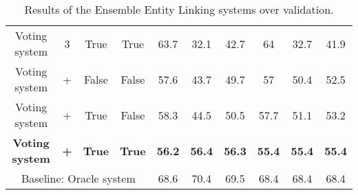 \begin{table}[h!]
{\begin{tabular}{|c|ccc|ccc|ccc|}
    Voting system                    & 3                                                                                                    & True                                                                                                      & True                               & 63.7                                 & 32.1                                    & 42.7              & 64                                   & 32.7                                    & 41.9              \\
    Voting system                    & +                                                                                                    & False                                                                                                     & False                              & 57.6                                 & 43.7                                    & 49.7              & 57                                   & 50.4                                    & 52.5              \\
    Voting system                    & +                                                                                                    & True                                                                                                      & False                              & 58.3                                 & 44.5                                    & 50.5              & 57.7                                 & 51.1                                    & 53.2              \\
    \textbf{Voting system}           & \textbf{+}                                                                                           & \textbf{True}                                                                                             & \textbf{True}                      & \textbf{56.2}                        & \textbf{56.4}                           & \textbf{56.3}     & \textbf{55.4}                        & \textbf{55.4}                           & \textbf{55.4}     \\ \hline
    \multicolumn{4}{|c|}{Baseline: Oracle system}                                                                                                                                                                                                                                            & 68.6                                 & 70.4                                    & 69.5              & 68.4                                 & 68.4                                    & 68.4              \\ \hline
    \end{tabular}%
    }
    \caption{Results of the Ensemble Entity Linking systems over \LCQuADtwo{} validation.}
    \label{table:eelResultsLcquad2}
\end{table}

